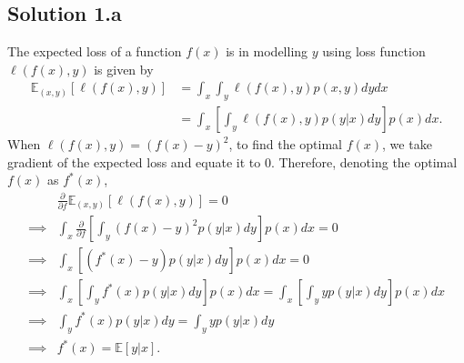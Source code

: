 \subsection*{Solution 1.a}
The expected loss of a function $f(x)$ is in modelling $y$ using loss function $\ell(f(x),y)$ is given by
\begin{align*}
	\mathbb{E}_{(x,y)}[\ell(f(x),y)] &= \int_x\int_y \ell(f(x),y)p(x,y)dydx\\
	&= \int_x \left[\int_y \ell(f(x),y)p(y|x)dy\right]p(x)dx.
\end{align*}
When $\ell(f(x),y) = (f(x)-y)^2$, to find the optimal $f(x)$, we take gradient of the expected loss and equate it to $0$. Therefore, denoting the optimal $f(x)$ as $f^*(x)$,
\begin{align*}
	&\frac{\partial}{\partial f}\mathbb{E}_{(x,y)}[\ell(f(x),y)] = 0\\
	\implies & \int_x \frac{\partial}{\partial f}\left[\int_y(f(x)-y)^2p(y|x)dy\right]p(x)dx = 0\\
	\implies & \int_x\left[(f^*(x)-y)p(y|x)dy\right]p(x)dx = 0\\
	\implies & \int_x\left[\int_y f^*(x)p(y|x)dy\right]p(x)dx = \int_x\left[\int_y yp(y|x)dy\right]p(x)dx\\
	\implies & \int_y f^*(x)p(y|x)dy = \int_y y p(y|x)dy\\
	\implies & f^*(x) = \mathbb{E}[y|x].
\end{align*}
